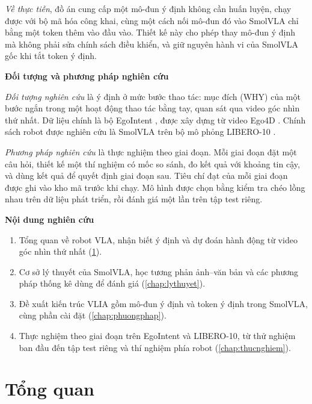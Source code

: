 \documentclass[a4paper,oneside]{report}
\newcommand{\mucnho}[1]{\par\vspace{4pt}\noindent\textbf{#1}\par\nobreak}
\begin{document}
\textit{Về thực tiễn}, đồ án cung cấp một mô-đun ý định không cần huấn luyện, chạy được với bộ mã hóa công khai, cùng một cách nối mô-đun đó vào SmolVLA chỉ bằng một token thêm vào đầu vào. Thiết kế này cho phép thay mô-đun ý định mà không phải sửa chính sách điều khiển, và giữ nguyên hành vi của SmolVLA gốc khi tắt token ý định.

\mucnho{Đối tượng và phương pháp nghiên cứu}

\textit{Đối tượng nghiên cứu} là ý định ở mức bước thao tác: mục đích (WHY) của một bước ngắn trong một hoạt động thao tác bằng tay, quan sát qua video góc nhìn thứ nhất. Dữ liệu chính là bộ EgoIntent \citep{egointent2026}, được xây dựng từ video Ego4D \citep{grauman2022ego4d}. Chính sách robot được nghiên cứu là SmolVLA trên bộ mô phỏng LIBERO-10 \citep{liu2023libero}.

\textit{Phương pháp nghiên cứu} là thực nghiệm theo giai đoạn. Mỗi giai đoạn đặt một câu hỏi, thiết kế một thí nghiệm có mốc so sánh, đo kết quả với khoảng tin cậy, và dùng kết quả để quyết định giai đoạn sau. Tiêu chí đạt của mỗi giai đoạn được ghi vào kho mã trước khi chạy. Mô hình được chọn bằng kiểm tra chéo lồng nhau trên dữ liệu phát triển, rồi đánh giá một lần trên tập test riêng.

\mucnho{Nội dung nghiên cứu}

\begin{enumerate}
  \item Tổng quan về robot VLA, nhận biết ý định và dự đoán hành động từ video góc nhìn thứ nhất (\cref{chap:tongquan}).
  \item Cơ sở lý thuyết của SmolVLA, học tương phản ảnh--văn bản và các phương pháp thống kê dùng để đánh giá (\cref{chap:lythuyet}).
  \item Đề xuất kiến trúc VLIA gồm mô-đun ý định và token ý định trong SmolVLA, cùng phần cài đặt (\cref{chap:phuongphap}).
  \item Thực nghiệm theo giai đoạn trên EgoIntent và LIBERO-10, từ thử nghiệm ban đầu đến tập test riêng và thí nghiệm phía robot (\cref{chap:thucnghiem}).
\end{enumerate}

\chapter{Tổng quan}
\label{chap:tongquan}
\end{document}
